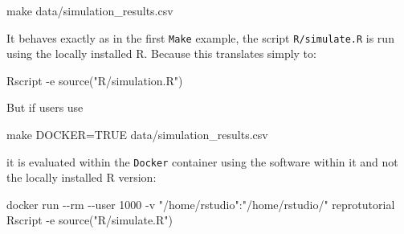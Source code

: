 \documentclass[psych,tutorial,accept,moreauthors,pdftex]{Definitions/mdpi}
\newenvironment{Shaded}{\begin{snugshade}}{\end{snugshade}}
\newcommand{\AttributeTok}[1]{\textcolor[rgb]{0.77,0.63,0.00}{#1}}
\newcommand{\ExtensionTok}[1]{#1}
\newcommand{\FunctionTok}[1]{\textcolor[rgb]{0.00,0.00,0.00}{#1}}
\newcommand{\NormalTok}[1]{#1}
\newcommand{\StringTok}[1]{\textcolor[rgb]{0.31,0.60,0.02}{#1}}
\begin{document}
\begin{paracol}{2}
\begin{adjustwidth}{0.5cm}{0cm} 
\begin{Shaded}
\begin{Highlighting}[]
\FunctionTok{make}\NormalTok{ data/simulation\_results.csv}
\end{Highlighting}
\end{Shaded}
\end{adjustwidth}

It behaves exactly as in the first \texttt{Make} example, the script
\texttt{R/simulate.R} is run using the locally installed R. Because this
translates simply to:

\begin{adjustwidth}{0.5cm}{0cm} 
\begin{Shaded}
\begin{Highlighting}[]
\ExtensionTok{Rscript} \AttributeTok{{-}e} \StringTok{\textquotesingle{}source("R/simulation.R")\textquotesingle{}}
\end{Highlighting}
\end{Shaded}
\end{adjustwidth}

But if users use

\begin{adjustwidth}{0.5cm}{0cm} 
\begin{Shaded}
\begin{Highlighting}[]
\FunctionTok{make}\NormalTok{ DOCKER=TRUE data/simulation\_results.csv}
\end{Highlighting}
\end{Shaded}
\end{adjustwidth}

it is evaluated within the \texttt{Docker} container using the software
within it and not the locally installed R version:

\begin{adjustwidth}{0.5cm}{0cm} 
\begin{Shaded}
\begin{Highlighting}[]
\ExtensionTok{docker}\NormalTok{ run }\AttributeTok{{-}{-}rm} \AttributeTok{{-}{-}user}\NormalTok{ 1000 }\AttributeTok{{-}v} \StringTok{"/home/rstudio"}\NormalTok{:}\StringTok{"/home/rstudio/"}
\ExtensionTok{reprotutorial}\NormalTok{ Rscript }\AttributeTok{{-}e} \StringTok{\textquotesingle{}source("R/simulate.R")\textquotesingle{}}
\end{Highlighting}
\end{Shaded}
\end{adjustwidth}


\end{paracol}
\end{document}
